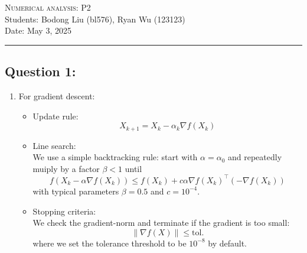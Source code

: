 \documentclass[11pt,onecolumn]{article}
\begin{document}
\noindent
\textsc{\Large Numerical analysis: P2}\\
Students: Bodong Liu (bl576), Ryan Wu (123123)\\
Date: May 3, 2025
\begin{center}\rule{1\linewidth}{0.5pt}\end{center}

\subsection*{Question 1:}
\noindent
\begin{enumerate}
    \item 
    For gradient descent:
    \begin{itemize}
        \item 
        Update rule:\\
        $$
        X_{k+1}=X_k - \alpha_k \nabla f(X_k)
        $$
        \item 
        Line search:\\
        We use a simple backtracking rule: start with $\alpha = \alpha_0$ and repeatedly muiply by a factor $\beta < 1$ until
        $$
        f(X_k - \alpha \nabla f(X_k)) \leq f(X_k) + c \alpha \nabla f(X_k)^\top (-\nabla f(X_k))
        $$
        with typical parameters $\beta = 0.5$ and $c=10^{-4}$.

        \item 
        Stopping criteria:\\
        We check the gradient-norm and terminate if the gradient is too small:
        $$
        \| \nabla f(X) \| \leq \text{tol}.
        $$
        where we set the tolerance threshold to be $10^{-8}$ by default.
    \end{itemize}
    

\end{enumerate}
\end{document}
